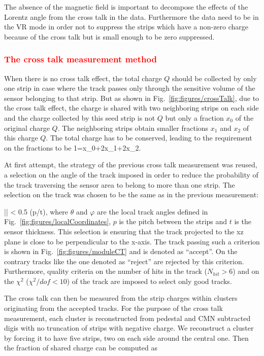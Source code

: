 The absence of the magnetic field is important to decompose the effects of the Lorentz angle from the cross talk in the data. Furthermore the data need to be in the VR mode in order not to suppress the strips which have a non-zero charge because of the cross talk but is small enough to be zero suppressed. 


\subsubsection{\textcolor{red}{The cross talk measurement method}}

When there is no cross talk effect, the total charge $Q$ should be collected by only one strip in case where the track passes only through the sensitive volume of the sensor belonging to that strip. But as shown in Fig.~\ref{fig:figures/crossTalk}, due to the cross talk effect, the charge is shared with two neighboring strips on each side and the charge collected by this seed strip is not $Q$ but only a fraction $x_{0}$ of the original charge $Q$. The neighboring strips obtain smaller fractions $x_{1}$ and $x_{2}$ of this charge $Q$. The total charge has to be conserved, leading to the requirement on the fractions to be 
{
1=x_{0}+2x_{1}+2x_{2}. 
}

At first attempt, the strategy of the previous cross talk measurement was reused, a selection on the angle of the track imposed in order to reduce the probability of the track traversing the sensor area to belong to more than one strip. The selection on the track was chosen to be the same as in the previous measurement:

{
|\tan \theta \cos \varphi| < 0.5 \times (p/t),
}
where $\theta$ and $\varphi$ are the local track angles defined in Fig.~\ref{fig:figures/localCoordinates}, $p$ is the pitch between the strips and $t$ is the sensor thickness. This selection is ensuring that the track projected to the xz plane is close to be perpendicular to the x-axis. The track passing such a criterion is shown in Fig.~\ref{fig:figures/moduleCT} and is denoted as ``accept''. On the contrary tracks like the one denoted as ``reject'' are rejected by this criterion. Furthermore, quality criteria on the number of hits in the track ($N_{hit}>6$) and on the $\chi^{2}$  ($\chi^{2}/dof < 10$) of the track are imposed to select only good tracks. 

The cross talk can then be measured from the strip charges within clusters originating from the accepted tracks. For the purpose of the cross talk measurement, each cluster is reconstructed from pedestal and CMN subtracted digis with no truncation of strips with negative charge. We reconstruct a cluster by forcing it to have five strips, two on each side around the central one. Then the fraction of shared charge can be computed as


